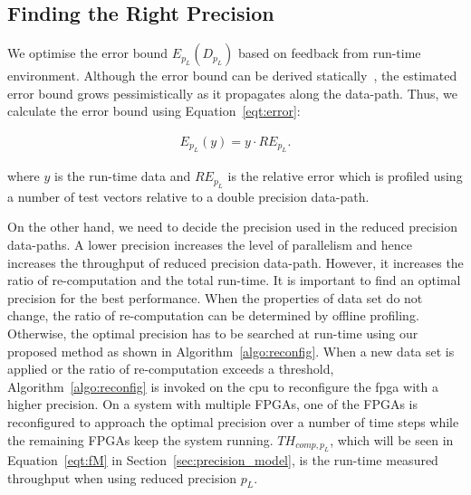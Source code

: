 \subsection{Finding the Right Precision}
\label{sec:precision_search}
We optimise the error bound $E_{p_L}(D_{p_L})$ based on feedback from run-time environment.
Although the error bound can be derived statically~\cite{lee05},
the estimated error bound grows pessimistically as it propagates along the data-path.
Thus, we calculate the error bound using Equation~\ref{eqt:error}:

\begin{equation}
\begin{aligned}
E_{p_L}(y) = y \cdot RE_{p_L} \mbox{.}
\end{aligned}
\label{eqt:error}
\end{equation}

where $y$ is the run-time data and $RE_{p_L}$ is the relative error which is profiled using a number of test vectors relative to a double precision data-path.

On the other hand, we need to decide the precision used in the reduced precision data-paths.
A lower precision increases the level of parallelism and hence increases the throughput of reduced precision data-path.
However, it increases the ratio of re-computation and the total run-time.
It is important to find an optimal precision for the best performance.
When the properties of data set do not change, the ratio of re-computation can be determined by offline profiling.
Otherwise, the optimal precision has to be searched at run-time using our proposed method as shown in Algorithm~\ref{algo:reconfig}.
When a new data set is applied or the ratio of re-computation exceeds a threshold,
Algorithm~\ref{algo:reconfig} is invoked on the \gls{cpu} to reconfigure the \gls{fpga} with a higher precision.
On a system with multiple FPGAs, one of the FPGAs is reconfigured to approach the optimal precision over a number of time steps
while the remaining FPGAs keep the system running.
$TH_{comp,p_L}$, which will be seen in Equation~\ref{eqt:fM} in Section~\ref{sec:precision_model}, is the run-time measured throughput when using reduced precision $p_L$.

